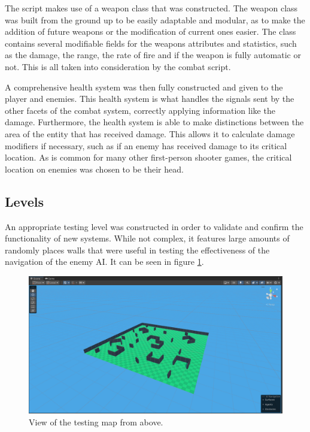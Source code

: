 \documentclass[11pt]{article}
\begin{document}
The script makes use of a weapon class that was constructed. The weapon class was built from the
ground up to be easily adaptable and modular, as to make the addition of future weapons or the
modification of current ones easier. The class contains several modifiable fields for the weapons
attributes and statistics, such as the damage, the range, the rate of fire and if the weapon is
fully automatic or not. This is all taken into consideration by the combat script.

A comprehensive health system was then fully constructed and given to the player and enemies. This
health system is what handles the signals sent by the other facets of the combat system, correctly
applying information like the damage. Furthermore, the health system is able to make distinctions
between the area of the entity that has received damage. This allows it to calculate damage
modifiers if necessary, such as if an enemy has received damage to its critical location. As is
common for many other first-person shooter games, the critical location on enemies was chosen to be
their head. \\

\subsection{Levels}
An appropriate testing level was constructed in order to validate and confirm the functionality of
new systems. While not complex, it features large amounts of randomly places walls that were useful
in testing the effectiveness of the navigation of the enemy AI. It can be seen in figure \ref{fig:testing-map}.

\begin{figure}[htb] 
    \centering
    \includegraphics[width=\columnwidth]{testing-map}
    \caption{View of the testing map from above.}
    \label{fig:testing-map}
\end{figure}
\end{document}
